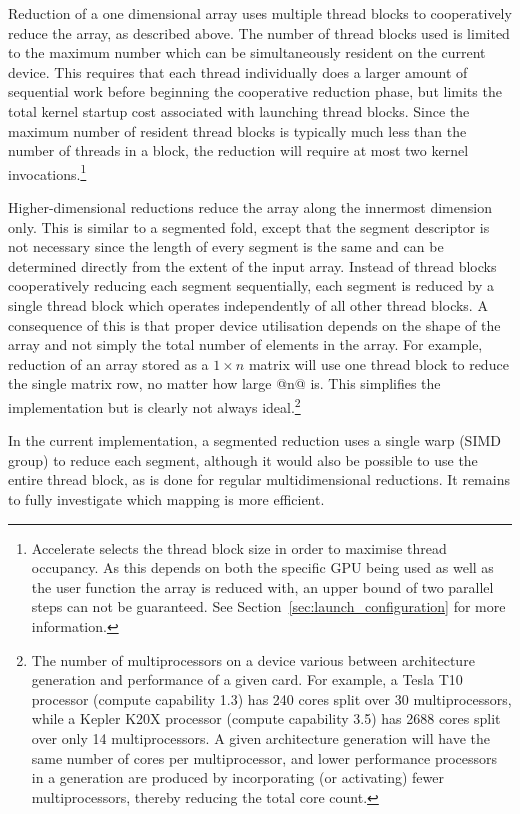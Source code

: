 Reduction of a one dimensional array uses multiple thread blocks to cooperatively reduce the array, as described above. The number of
thread blocks used is limited to the maximum number which can be simultaneously
resident on the current device. This requires that each thread individually does
a larger amount of sequential work before beginning the cooperative reduction
phase, but limits the total kernel startup cost associated with launching thread
blocks. Since the maximum number of resident thread blocks is typically much
less than the number of threads in a block, the reduction will require at most
two kernel invocations.\footnote{Accelerate selects the thread block size in
order to maximise thread occupancy. As this depends on both the specific GPU
being used as well as the user function the array is reduced with, an upper
bound of two parallel steps can not be guaranteed. See
Section~\ref{sec:launch_configuration} for more information.}

Higher-dimensional reductions reduce the array along the innermost dimension
only. This is similar to a segmented fold, except that the segment descriptor is
not necessary since the length of every segment is the same and can be
determined directly from the extent of the input array. Instead of thread blocks
cooperatively reducing each segment sequentially, each segment is reduced by a
single thread block which operates independently of all other thread blocks. A
consequence of this is that proper device utilisation depends on the shape of
the array and not simply the total number of elements in the array. For example,
reduction of an array stored as a $1 \times n$ matrix will use one thread
block to reduce the single matrix row,
no matter how large @n@ is. This simplifies the implementation but is clearly
not always ideal.\footnote{The number of multiprocessors on a device various
between architecture generation and performance of a given card. For example, a
Tesla T10 processor (compute capability 1.3) has 240 cores split over 30
multiprocessors, while a Kepler K20X processor (compute capability 3.5) has 2688
cores split over only 14 multiprocessors. A given architecture generation will
have the same number of cores per multiprocessor, and lower performance
processors in a generation are produced by incorporating (or activating) fewer
multiprocessors, thereby reducing the total core count.}

In the current implementation, a segmented reduction uses a single
warp\cuda[warp]{} (SIMD group) to reduce each segment, although it would also be
possible to use the entire thread block, as is done for regular multidimensional
reductions. It remains to fully investigate which mapping is more efficient.


